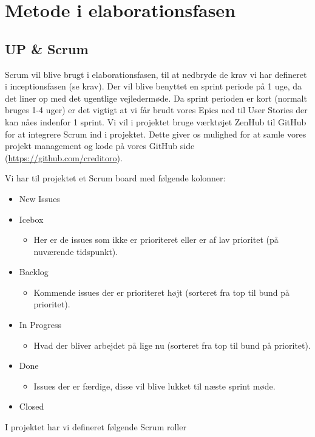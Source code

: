 \section{Metode i elaborationsfasen}


\subsection{UP \& Scrum}

Scrum vil blive brugt i elaborationsfasen, til at nedbryde de krav vi har defineret i inceptionsfasen (se krav). Der vil blive benyttet en sprint periode på 1 uge, da det liner op med det ugentlige vejledermøde. Da sprint perioden er kort (normalt bruges 1-4 uger) er det vigtigt at vi får brudt vores Epics ned til User Stories der kan nåes indenfor 1 sprint.
Vi vil i projektet bruge værktøjet ZenHub til GitHub for at integrere Scrum ind i projektet.
Dette giver os mulighed for at samle vores projekt management og kode på vores GitHub side (\url{https://github.com/creditoro}).

\noindent
Vi har til projektet et Scrum board med følgende kolonner:
\begin{itemize}
    \item New Issues
    \item Icebox
    \begin{itemize}
        \item Her er de issues som ikke er prioriteret eller er af lav prioritet (på nuværende tidspunkt).
    \end{itemize}
    \item Backlog
    \begin{itemize}
        \item Kommende issues der er prioriteret højt (sorteret fra top til bund på prioritet).
    \end{itemize}
    \item In Progress
    \begin{itemize}
        \item Hvad der bliver arbejdet på lige nu (sorteret fra top til bund på prioritet).
    \end{itemize}
    \item Done
    \begin{itemize}
        \item Issues der er færdige, disse vil blive lukket til næste sprint møde.
    \end{itemize}
    \item Closed
\end{itemize}
I projektet har vi defineret følgende Scrum roller




